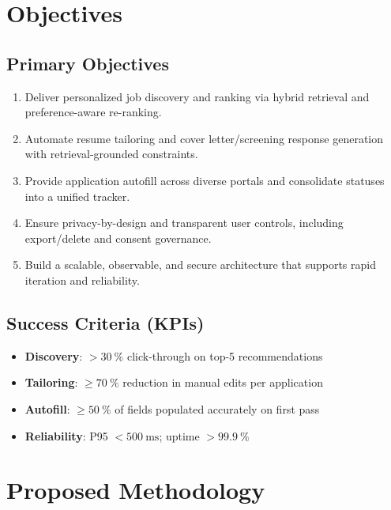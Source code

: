 \documentclass[12pt,a4paper]{report}
\begin{document}
\chapter{Objectives}
\section{Primary Objectives}
\begin{enumerate}[leftmargin=2em]
  \item Deliver personalized job discovery and ranking via hybrid retrieval and preference-aware re-ranking.
  \item Automate resume tailoring and cover letter/screening response generation with retrieval-grounded constraints.
  \item Provide application autofill across diverse portals and consolidate statuses into a unified tracker.
  \item Ensure privacy-by-design and transparent user controls, including export/delete and consent governance.
  \item Build a scalable, observable, and secure architecture that supports rapid iteration and reliability.
\end{enumerate}

\section{Success Criteria (KPIs)}
\begin{itemize}[leftmargin=2em]
  \item \textbf{Discovery}: $>\SI{30}{\percent}$ click-through on top-5 recommendations
  \item \textbf{Tailoring}: $\geq \SI{70}{\percent}$ reduction in manual edits per application
  \item \textbf{Autofill}: $\geq \SI{50}{\percent}$ of fields populated accurately on first pass
  \item \textbf{Reliability}: P95 $< \SI{500}{\milli\second}$; uptime $>\SI{99.9}{\percent}$
\end{itemize}

\chapter{Proposed Methodology}
\end{document}
